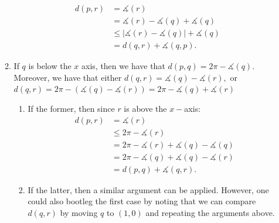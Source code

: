 \documentclass[11pt]{article}
\begin{document}
\begin{solution}
\begin{enumerate}
\begin{enumerate}
            \begin{align*}
                d(p,r) &= \measuredangle(r)\\
                &= \measuredangle(r) - \measuredangle(q) + \measuredangle(q)\\
                &\leq |\measuredangle(r) - \measuredangle(q)| + \measuredangle(q)\\
                &= d(q,r) + \measuredangle(q,p).
            \end{align*}
            \item If $q$ is below the $x$ axis, then we have that $d(p,q) = 2\pi - \measuredangle(q).$ Moreover, we have that either $d(q,r) = \measuredangle(q) - \measuredangle(r),$ or $d(q,r) = 2\pi - (\measuredangle(q)- \measuredangle(r)) = 2\pi - \measuredangle(q) + \measuredangle(r)$
            \begin{enumerate}
                \item If the former, then since $r$ is above the $x-$axis:
                \begin{align*}
                    d(p,r) &= \measuredangle(r)\\
                    &\leq 2\pi - \measuredangle(r)\\
                    &= 2\pi - \measuredangle(r) + \measuredangle(q) - \measuredangle(q)\\
                    &= 2\pi - \measuredangle(q) + \measuredangle(q) - \measuredangle(r)\\
                    &= d(p,q) + \measuredangle(q,r).
                \end{align*}
                \item If the latter, then a similar argument can be applied. However, one could also bootleg the first case by noting that we can compare $d(q,r)$ by moving $q$ to $(1,0)$ and repeating the arguments above.
            \end{enumerate}
        \end{enumerate}
    \end{enumerate}
\end{solution}
\newpage
\end{document}

